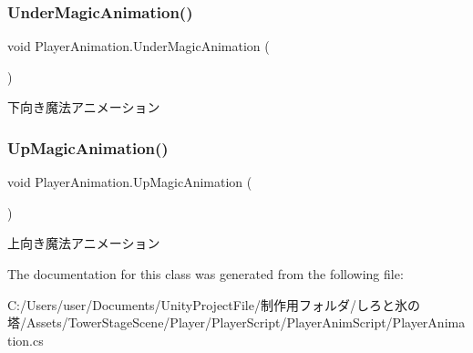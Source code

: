 \subsubsection{\texorpdfstring{Under\+Magic\+Animation()}{UnderMagicAnimation()}}
{\footnotesize\ttfamily void Player\+Animation.\+Under\+Magic\+Animation (\begin{DoxyParamCaption}{ }\end{DoxyParamCaption})\hspace{0.3cm}{\ttfamily [inline]}}



下向き魔法アニメーション 

\mbox{\label{class_player_animation_a5e13800596dcf4cb95379c50746e4586}} 
\subsubsection{\texorpdfstring{Up\+Magic\+Animation()}{UpMagicAnimation()}}
{\footnotesize\ttfamily void Player\+Animation.\+Up\+Magic\+Animation (\begin{DoxyParamCaption}{ }\end{DoxyParamCaption})\hspace{0.3cm}{\ttfamily [inline]}}



上向き魔法アニメーション 



The documentation for this class was generated from the following file\+:\begin{DoxyCompactItemize}
\item 
C\+:/\+Users/user/\+Documents/\+Unity\+Project\+File/制作用フォルダ/しろと氷の塔/\+Assets/\+Tower\+Stage\+Scene/\+Player/\+Player\+Script/\+Player\+Anim\+Script/Player\+Animation.\+cs\end{DoxyCompactItemize}

